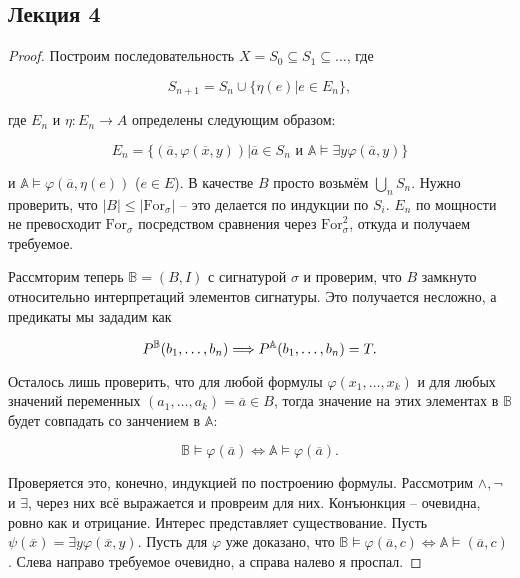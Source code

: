 \subsection{Лекция 4}

\begin{proof}
    Построим последовательность $X = S_0 \subseteq S_1 \subseteq \ldots$, где 

    \[ 
        S_{n+1} = S_n \cup \{\eta(e)| e \in E_n\},
    \]

    где $E_n$ и $\eta: E_n \rightarrow A$ определены следующим образом: 

    \[ 
        E_n = \{(\overline{a}, \varphi(\overline{x}, y))| \overline{a} \in S_n \text{ и } \mathbb{A} \models \exists y \varphi(\overline{a}, y)\}
    \]

    и $\mathbb{A} \models \varphi(\overline{a}, \eta(e))$ ($e \in E$). В качестве $B$ просто возьмём $\bigcup_n S_n$. Нужно проверить, что $|B| \leq |\text{For}_{\sigma}|$ -- это делается по индукции по $S_i$. $E_n$ по мощности не превосходит $\text{For}_{\sigma}$ посредством сравнения через $\text{For}_\sigma^2$, откуда и получаем требуемое. \ 
    
    Рассмторим теперь $\mathbb{B} = (B, I)$ с сигнатурой $\sigma$ и проверим, что $B$ замкнуто относительно интерпретаций элементов сигнатуры. Это получается несложно, а предикаты мы зададим как  

    \[ 
        P^{\mathbb{B}}(b_1, \ldots, b_n) \Longrightarrow P^{\mathbb{A}}(b_1, \ldots, b_n) = T.
    \]

    Осталось лишь проверить, что для любой формулы $\varphi(x_1, \ldots, x_k)$ и для любых значений переменных $(a_1, \ldots, a_k) = \overline{a} \in B$, тогда значение на этих элементах в $\mathbb{B}$ будет совпадать со занчением в $\mathbb{A}$: 

    \[ 
        \mathbb{B} \models \varphi(\overline{a}) \Longleftrightarrow \mathbb{A} \models \varphi(\overline{a}).
    \]

    Проверяется это, конечно, индукцией по построению формулы. Рассмотрим $\wedge, \neg$ и $\exists$, через них всё выражается и провреим для них. Конъюнкция -- очевидна, ровно как и отрицание. Интерес представляет существование. Пусть $\psi(\overline{x}) = \exists y \varphi(\overline{x}, y)$. Пусть для $\varphi$ уже доказано, что $\mathbb{B} \models \varphi(\overline{a}, c) \Longleftrightarrow \mathbb{A} \models(\overline{a}, c)$. Слева направо требуемое очевидно, а справа налево я проспал.
\end{proof} 

